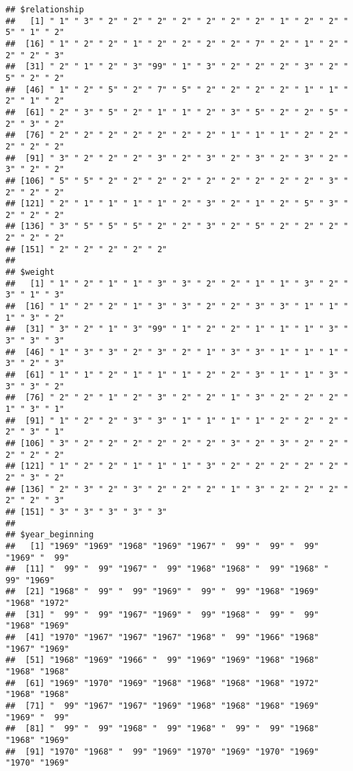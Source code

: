 \documentclass[
]{article}
\begin{document}
\begin{verbatim}
## $relationship
##   [1] " 1" " 3" " 2" " 2" " 2" " 2" " 2" " 2" " 2" " 1" " 2" " 2" " 5" " 1" " 2"
##  [16] " 1" " 2" " 2" " 1" " 2" " 2" " 2" " 2" " 7" " 2" " 1" " 2" " 2" " 2" " 3"
##  [31] " 2" " 1" " 2" " 3" "99" " 1" " 3" " 2" " 2" " 2" " 3" " 2" " 5" " 2" " 2"
##  [46] " 1" " 2" " 5" " 2" " 7" " 5" " 2" " 2" " 2" " 2" " 1" " 1" " 2" " 1" " 2"
##  [61] " 2" " 3" " 5" " 2" " 1" " 1" " 2" " 3" " 5" " 2" " 2" " 5" " 2" " 3" " 2"
##  [76] " 2" " 2" " 2" " 2" " 2" " 2" " 2" " 1" " 1" " 1" " 2" " 2" " 2" " 2" " 2"
##  [91] " 3" " 2" " 2" " 2" " 3" " 2" " 3" " 2" " 3" " 2" " 3" " 2" " 3" " 2" " 2"
## [106] " 5" " 5" " 2" " 2" " 2" " 2" " 2" " 2" " 2" " 2" " 2" " 3" " 2" " 2" " 2"
## [121] " 2" " 1" " 1" " 1" " 1" " 2" " 3" " 2" " 1" " 2" " 5" " 3" " 2" " 2" " 2"
## [136] " 3" " 5" " 5" " 5" " 2" " 2" " 3" " 2" " 5" " 2" " 2" " 2" " 2" " 2" " 2"
## [151] " 2" " 2" " 2" " 2" " 2"
## 
## $weight
##   [1] " 1" " 2" " 1" " 1" " 3" " 3" " 2" " 2" " 1" " 1" " 3" " 2" " 3" " 1" " 3"
##  [16] " 1" " 2" " 2" " 1" " 3" " 3" " 2" " 2" " 3" " 3" " 1" " 1" " 1" " 3" " 2"
##  [31] " 3" " 2" " 1" " 3" "99" " 1" " 2" " 2" " 1" " 1" " 1" " 3" " 3" " 3" " 3"
##  [46] " 1" " 3" " 3" " 2" " 3" " 2" " 1" " 3" " 3" " 1" " 1" " 1" " 3" " 2" " 3"
##  [61] " 1" " 1" " 2" " 1" " 1" " 1" " 2" " 2" " 3" " 1" " 1" " 3" " 3" " 3" " 2"
##  [76] " 2" " 2" " 1" " 2" " 3" " 2" " 2" " 1" " 3" " 2" " 2" " 2" " 1" " 3" " 1"
##  [91] " 1" " 2" " 2" " 3" " 3" " 1" " 1" " 1" " 1" " 2" " 2" " 2" " 2" " 3" " 1"
## [106] " 3" " 2" " 2" " 2" " 2" " 2" " 2" " 3" " 2" " 3" " 2" " 2" " 2" " 2" " 2"
## [121] " 1" " 2" " 2" " 1" " 1" " 1" " 3" " 2" " 2" " 2" " 2" " 2" " 2" " 3" " 2"
## [136] " 2" " 3" " 2" " 3" " 2" " 2" " 2" " 1" " 3" " 2" " 2" " 2" " 2" " 2" " 3"
## [151] " 3" " 3" " 3" " 3" " 3"
## 
## $year_beginning
##   [1] "1969" "1969" "1968" "1969" "1967" "  99" "  99" "  99" "1969" "  99"
##  [11] "  99" "  99" "1967" "  99" "1968" "1968" "  99" "1968" "  99" "1969"
##  [21] "1968" "  99" "  99" "1969" "  99" "  99" "1968" "1969" "1968" "1972"
##  [31] "  99" "  99" "1967" "1969" "  99" "1968" "  99" "  99" "1968" "1969"
##  [41] "1970" "1967" "1967" "1967" "1968" "  99" "1966" "1968" "1967" "1969"
##  [51] "1968" "1969" "1966" "  99" "1969" "1969" "1968" "1968" "1968" "1968"
##  [61] "1969" "1970" "1969" "1968" "1968" "1968" "1968" "1972" "1968" "1968"
##  [71] "  99" "1967" "1967" "1969" "1968" "1968" "1968" "1969" "1969" "  99"
##  [81] "  99" "  99" "1968" "  99" "1968" "  99" "  99" "1968" "1968" "1969"
##  [91] "1970" "1968" "  99" "1969" "1970" "1969" "1970" "1969" "1970" "1969"

\end{verbatim}
\end{document}
